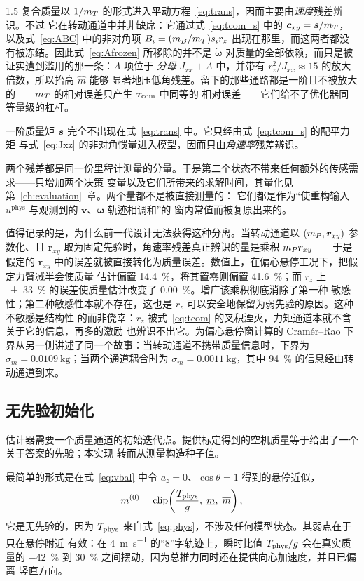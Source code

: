 \begin{spacing}{1.5}
复合质量以 $1/m_T$ 的形式进入平动方程~\eqref{eq:trans}，因而主要由\emph{速度}残差辨识。不过
它在转动通道中并非缺席：它通过式~\eqref{eq:tcom_s} 中的 $\bm{c}_{xy}=\bm{s}/m_T$，以及式~\eqref{eq:ABC}
中的非对角项 $B_i=(m_B/m_T)s_i r_z$ 出现在那里，而这两者都没有被冻结。因此式~\eqref{eq:Afrozen}
所移除的并不是 $\dot{\bm{\omega}}$ 对质量的全部依赖，而只是被证实遭到滥用的那一条：$A$ 项位于
\emph{分母} $J_{xx}+A$ 中，并带有 $r_z^2/J_{xx}\approx15$ 的放大倍数，所以抬高 $\hat m$ 能够
显著地压低角残差。留下的那些通路都是一阶且不被放大的——$m_T$ 的相对误差只产生 $\bm{\tau}_{\mathrm{com}}$ 中同等的
相对误差——它们给不了优化器同等量级的杠杆。

一阶质量矩 $\bm{s}$ 完全不出现在式~\eqref{eq:trans} 中。它只经由式~\eqref{eq:tcom_s} 的配平力矩
与式~\eqref{eq:Jxz} 的非对角惯量进入模型，因而只由\emph{角速率}残差辨识。

两个残差都是同一份里程计测量的分量。于是第二个状态不带来任何额外的传感需求——只增加两个决策
变量以及它们所带来的求解时间，其量化见第~\ref{ch:evaluation}~章。两个量都不是被直接测量的：
它们都是作为“使重构输入 $u^{\mathrm{phys}}$ 与观测到的 $\bm v$、$\bm\omega$ 轨迹相调和”的
窗内常值而被复原出来的。

值得记录的是，为什么前一代设计无法获得这种分离。当转动通道以 $(m_P,\bm r_{xy})$ 参数化、且
$\bm r_{xy}$ 取为固定先验时，角速率残差真正辨识的量是乘积 $m_P\bm r_{xy}$——于是假定的
$\bm r_{xy}$ 中的误差就被直接转化为质量误差。数值上，在偏心悬停工况下，把假定力臂减半会使质量
估计偏置 \SI{+14.4}{\percent}，将其置零则偏置 \SI{+41.6}{\percent}；而 $r_z$ 上
\SI{\pm33}{\percent} 的误差使质量估计改变了 \SI{0.00}{\percent}。增广该乘积彻底消除了第一种
敏感性；第二种敏感性本就不存在，这也是 $r_z$ 可以安全地保留为弱先验的原因。这种不敏感是结构性
的而非侥幸：$r_z$ 被式~\eqref{eq:tcom} 的叉积湮灭，力矩通道本就不含关于它的信息，再多的激励
也辨识不出它。为偏心悬停窗计算的
Cramér--Rao 下界从另一侧讲述了同一个故事：当转动通道不携带质量信息时，下界为
$\sigma_m=\SI{0.0109}{\kg}$；当两个通道耦合时为 $\sigma_m=\SI{0.0011}{\kg}$，其中
\SI{94}{\percent} 的信息经由转动通道到来。

\subsection{无先验初始化}\label{sec:model:seed}

估计器需要一个质量通道的初始迭代点。提供标定得到的空机质量等于给出了一个关于答案的先验；本实现
转而从测量构造种子值。

最简单的形式是在式~\eqref{eq:vbal} 中令 $a_z=0$、$\cos\theta=1$ 得到的悬停近似，
\begin{equation}
m^{(0)}=\operatorname{clip}\!\left(\frac{T_{\mathrm{phys}}}{g},\; \underline m,\; \overline m\right),
\label{eq:massseed}
\end{equation}
它是无先验的，因为 $T_{\mathrm{phys}}$ 来自式~\eqref{eq:phys}，不涉及任何模型状态。其弱点在于只在悬停附近
有效：在 \SI{4}{\meter\per\second} 的“8”字轨迹上，瞬时比值 $T_{\mathrm{phys}}/g$ 会在真实质量的
\SI{-42}{\percent} 到 \SI{+30}{\percent} 之间摆动，因为总推力同时还在提供向心加速度，并且已偏离
竖直方向。


\end{spacing}
